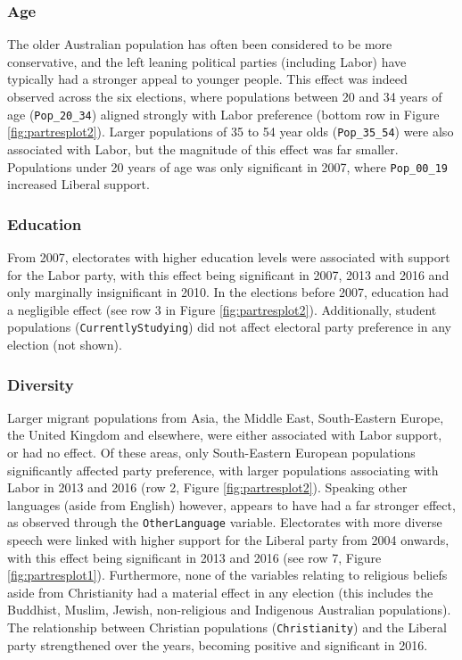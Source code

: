 \documentclass[
  times, doublespace]{anzsauth}
\begin{document}
\hypertarget{age}{%
\subsubsection*{Age}\label{age}}

The older Australian population has often been considered to be more conservative, and the left leaning political parties (including Labor) have typically had a stronger appeal to younger people. This effect was indeed observed across the six elections, where populations between 20 and 34 years of age (\texttt{Pop\_20\_34}) aligned strongly with Labor preference (bottom row in Figure \ref{fig:partresplot2}). Larger populations of 35 to 54 year olds (\texttt{Pop\_35\_54}) were also associated with Labor, but the magnitude of this effect was far smaller. Populations under 20 years of age was only significant in 2007, where \texttt{Pop\_00\_19} increased Liberal support.

\hypertarget{education}{%
\subsubsection*{Education}\label{education}}

From 2007, electorates with higher education levels were associated with support for the Labor party, with this effect being significant in 2007, 2013 and 2016 and only marginally insignificant in 2010. In the elections before 2007, education had a negligible effect (see row 3 in Figure \ref{fig:partresplot2}). Additionally, student populations (\texttt{CurrentlyStudying}) did not affect electoral party preference in any election (not shown).

\hypertarget{diversity}{%
\subsubsection*{Diversity}\label{diversity}}

Larger migrant populations from Asia, the Middle East, South-Eastern Europe, the United Kingdom and elsewhere, were either associated with Labor support, or had no effect. Of these areas, only South-Eastern European populations significantly affected party preference, with larger populations associating with Labor in 2013 and 2016 (row 2, Figure \ref{fig:partresplot2}). Speaking other languages (aside from English) however, appears to have had a far stronger effect, as observed through the \texttt{OtherLanguage} variable. Electorates with more diverse speech were linked with higher support for the Liberal party from 2004 onwards, with this effect being significant in 2013 and 2016 (see row 7, Figure \ref{fig:partresplot1}). Furthermore, none of the variables relating to religious beliefs aside from Christianity had a material effect in any election (this includes the Buddhist, Muslim, Jewish, non-religious and Indigenous Australian populations). The relationship between Christian populations (\texttt{Christianity}) and the Liberal party strengthened over the years, becoming positive and significant in 2016.
\end{document}
